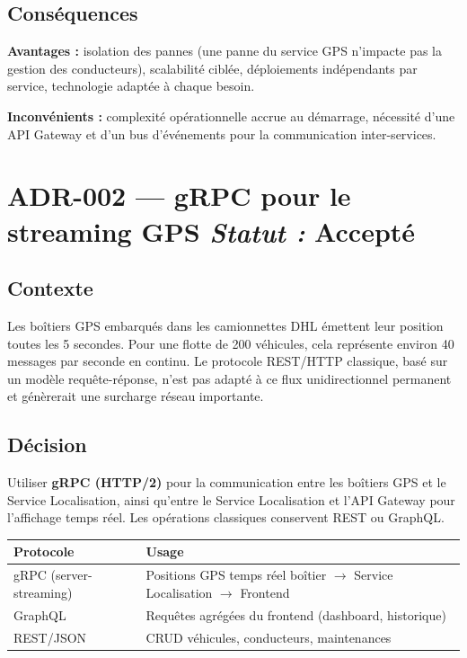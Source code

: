 \documentclass[10pt,a4paper]{article}
\newcommand{\adrstatus}[1]{\hfill{\small\color{muted}\textit{Statut :} \textbf{#1}}}
\begin{document}
\subsection{Conséquences}
\textbf{Avantages :} isolation des pannes (une panne du service GPS n'impacte pas la gestion des conducteurs), scalabilité ciblée, déploiements indépendants par service, technologie adaptée à chaque besoin.

\noindent\textbf{Inconvénients :} complexité opérationnelle accrue au démarrage, nécessité d'une API Gateway et d'un bus d'événements pour la communication inter-services.

\section{ADR-002 --- gRPC pour le streaming GPS \adrstatus{Accepté}}

\subsection{Contexte}
Les boîtiers GPS embarqués dans les camionnettes DHL émettent leur position toutes les 5 secondes. Pour une flotte de 200 véhicules, cela représente environ 40 messages par seconde en continu. Le protocole REST/HTTP classique, basé sur un modèle requête-réponse, n'est pas adapté à ce flux unidirectionnel permanent et génèrerait une surcharge réseau importante.

\subsection{Décision}
Utiliser \textbf{gRPC (HTTP/2)} pour la communication entre les boîtiers GPS et le Service Localisation, ainsi qu'entre le Service Localisation et l'API Gateway pour l'affichage temps réel. Les opérations classiques conservent REST ou GraphQL.

\vspace{4pt}
\begin{tabularx}{\linewidth}{lX}
  \toprule
  \small\textbf{Protocole} & \small\textbf{Usage} \\
  \midrule
  gRPC (server-streaming) & Positions GPS temps réel boîtier $\rightarrow$ Service Localisation $\rightarrow$ Frontend \\
  GraphQL                 & Requêtes agrégées du frontend (dashboard, historique) \\
  REST/JSON               & CRUD véhicules, conducteurs, maintenances \\
  \bottomrule
\end{tabularx}
\end{document}
